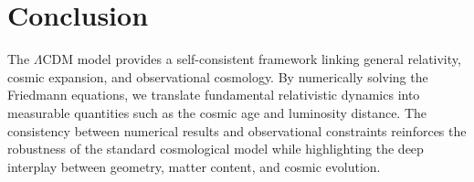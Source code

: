 \documentclass[12pt, a4paper]{article}
\begin{document}
\section{Conclusion}

The $\Lambda$CDM model provides a self-consistent framework linking general relativity, cosmic expansion, and observational cosmology. By numerically solving the Friedmann equations, we translate fundamental relativistic dynamics into measurable quantities such as the cosmic age and luminosity distance. The consistency between numerical results and observational constraints reinforces the robustness of the standard cosmological model while highlighting the deep interplay between geometry, matter content, and cosmic evolution.
\end{document}
